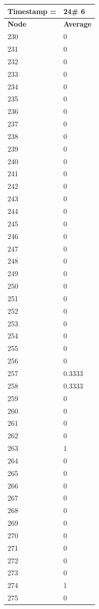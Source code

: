 \begin{tabular}{|l||l|}
\hline
\textbf{Timestamp =} & \textbf{24}\# 6\\\hline
	\textbf{Node} & \textbf{Average} \\ \hline
\hline
	230 & 0 \\ \hline
	231 & 0 \\ \hline
	232 & 0 \\ \hline
	233 & 0 \\ \hline
	234 & 0 \\ \hline
	235 & 0 \\ \hline
	236 & 0 \\ \hline
	237 & 0 \\ \hline
	238 & 0 \\ \hline
	239 & 0 \\ \hline
	240 & 0 \\ \hline
	241 & 0 \\ \hline
	242 & 0 \\ \hline
	243 & 0 \\ \hline
	244 & 0 \\ \hline
	245 & 0 \\ \hline
	246 & 0 \\ \hline
	247 & 0 \\ \hline
	248 & 0 \\ \hline
	249 & 0 \\ \hline
	250 & 0 \\ \hline
	251 & 0 \\ \hline
	252 & 0 \\ \hline
	253 & 0 \\ \hline
	254 & 0 \\ \hline
	255 & 0 \\ \hline
	256 & 0 \\ \hline
	257 & 0.3333 \\ \hline
	258 & 0.3333 \\ \hline
	259 & 0 \\ \hline
	260 & 0 \\ \hline
	261 & 0 \\ \hline
	262 & 0 \\ \hline
	263 & 1 \\ \hline
	264 & 0 \\ \hline
	265 & 0 \\ \hline
	266 & 0 \\ \hline
	267 & 0 \\ \hline
	268 & 0 \\ \hline
	269 & 0 \\ \hline
	270 & 0 \\ \hline
	271 & 0 \\ \hline
	272 & 0 \\ \hline
	273 & 0 \\ \hline
	274 & 1 \\ \hline
	275 & 0 \\ \hline
\end{tabular}

